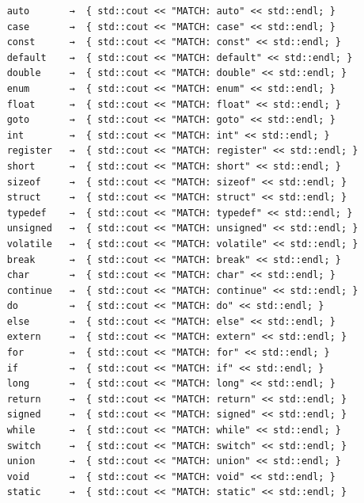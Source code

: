 \documentclass{article}
\begin{document}
\begin{lstlisting}
    auto       →  { std::cout << "MATCH: auto" << std::endl; }             
    case       →  { std::cout << "MATCH: case" << std::endl; }             
    const      →  { std::cout << "MATCH: const" << std::endl; }              
    default    →  { std::cout << "MATCH: default" << std::endl; }                
    double     →  { std::cout << "MATCH: double" << std::endl; }               
    enum       →  { std::cout << "MATCH: enum" << std::endl; }             
    float      →  { std::cout << "MATCH: float" << std::endl; }              
    goto       →  { std::cout << "MATCH: goto" << std::endl; }             
    int        →  { std::cout << "MATCH: int" << std::endl; }            
    register   →  { std::cout << "MATCH: register" << std::endl; }                 
    short      →  { std::cout << "MATCH: short" << std::endl; }              
    sizeof     →  { std::cout << "MATCH: sizeof" << std::endl; }               
    struct     →  { std::cout << "MATCH: struct" << std::endl; }               
    typedef    →  { std::cout << "MATCH: typedef" << std::endl; }                
    unsigned   →  { std::cout << "MATCH: unsigned" << std::endl; }                 
    volatile   →  { std::cout << "MATCH: volatile" << std::endl; }                 
    break      →  { std::cout << "MATCH: break" << std::endl; }              
    char       →  { std::cout << "MATCH: char" << std::endl; }             
    continue   →  { std::cout << "MATCH: continue" << std::endl; }                 
    do         →  { std::cout << "MATCH: do" << std::endl; }           
    else       →  { std::cout << "MATCH: else" << std::endl; }             
    extern     →  { std::cout << "MATCH: extern" << std::endl; }               
    for        →  { std::cout << "MATCH: for" << std::endl; }            
    if         →  { std::cout << "MATCH: if" << std::endl; }           
    long       →  { std::cout << "MATCH: long" << std::endl; }             
    return     →  { std::cout << "MATCH: return" << std::endl; }               
    signed     →  { std::cout << "MATCH: signed" << std::endl; }               
    while      →  { std::cout << "MATCH: while" << std::endl; }              
    switch     →  { std::cout << "MATCH: switch" << std::endl; }               
    union      →  { std::cout << "MATCH: union" << std::endl; }              
    void       →  { std::cout << "MATCH: void" << std::endl; }             
    static     →  { std::cout << "MATCH: static" << std::endl; }
    

\end{lstlisting}
\end{document}
